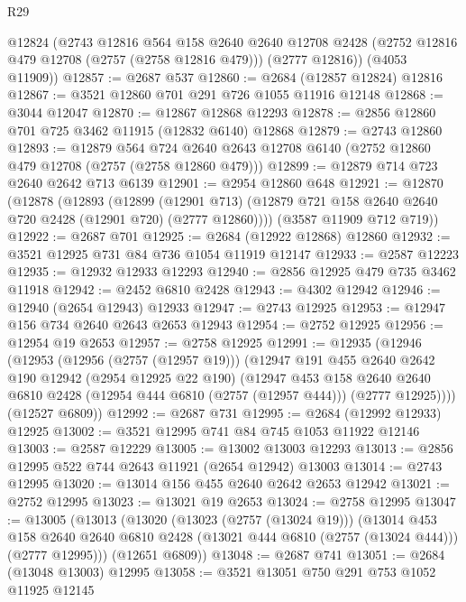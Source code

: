\begin{lexlean}{R29}
\begin{coremodule}
      @12824
      (@2743
        @12816
        @564
        @158
        @2640
        @2640
        @12708
        @2428
        (@2752 @12816 @479 @12708 (@2757 (@2758 @12816 @479)))
        (@2777 @12816))
      (@4053 @11909))
@12857 := @2687 @537
@12860 := @2684 (@12857 @12824) @12816
@12867 := @3521 @12860 @701 @291 @726 @1055 @11916 @12148
@12868 := @3044 @12047
@12870 := @12867 @12868 @12293
@12878 := @2856 @12860 @701 @725 @3462 @11915 (@12832 @6140) @12868
@12879 := @2743 @12860
@12893 := @12879
    @564
    @724
    @2640
    @2643
    @12708
    @6140
    (@2752 @12860 @479 @12708 (@2757 (@2758 @12860 @479)))
@12899 := @12879 @714 @723 @2640 @2642 @713 @6139
@12901 := @2954 @12860 @648
@12921 := @12870
    (@12878
      (@12893
        (@12899
          (@12901 @713)
          (@12879 @721 @158 @2640 @2640 @720 @2428 (@12901 @720) (@2777 @12860))))
      (@3587 @11909 @712 @719))
@12922 := @2687 @701
@12925 := @2684 (@12922 @12868) @12860
@12932 := @3521 @12925 @731 @84 @736 @1054 @11919 @12147
@12933 := @2587 @12223
@12935 := @12932 @12933 @12293
@12940 := @2856 @12925 @479 @735 @3462 @11918
@12942 := @2452 @6810 @2428
@12943 := @4302 @12942
@12946 := @12940 (@2654 @12943) @12933
@12947 := @2743 @12925
@12953 := @12947 @156 @734 @2640 @2643 @2653 @12943
@12954 := @2752 @12925
@12956 := @12954 @19 @2653
@12957 := @2758 @12925
@12991 := @12935
    (@12946
      (@12953
        (@12956 (@2757 (@12957 @19)))
        (@12947
          @191
          @455
          @2640
          @2642
          @190
          @12942
          (@2954 @12925 @22 @190)
          (@12947
            @453
            @158
            @2640
            @2640
            @6810
            @2428
            (@12954 @444 @6810 (@2757 (@12957 @444)))
            (@2777 @12925))))
      (@12527 @6809))
@12992 := @2687 @731
@12995 := @2684 (@12992 @12933) @12925
@13002 := @3521 @12995 @741 @84 @745 @1053 @11922 @12146
@13003 := @2587 @12229
@13005 := @13002 @13003 @12293
@13013 := @2856 @12995 @522 @744 @2643 @11921 (@2654 @12942) @13003
@13014 := @2743 @12995
@13020 := @13014 @156 @455 @2640 @2642 @2653 @12942
@13021 := @2752 @12995
@13023 := @13021 @19 @2653
@13024 := @2758 @12995
@13047 := @13005
    (@13013
      (@13020
        (@13023 (@2757 (@13024 @19)))
        (@13014
          @453
          @158
          @2640
          @2640
          @6810
          @2428
          (@13021 @444 @6810 (@2757 (@13024 @444)))
          (@2777 @12995)))
      (@12651 @6809))
@13048 := @2687 @741
@13051 := @2684 (@13048 @13003) @12995
@13058 := @3521 @13051 @750 @291 @753 @1052 @11925 @12145

\end{coremodule}
\end{lexlean}
